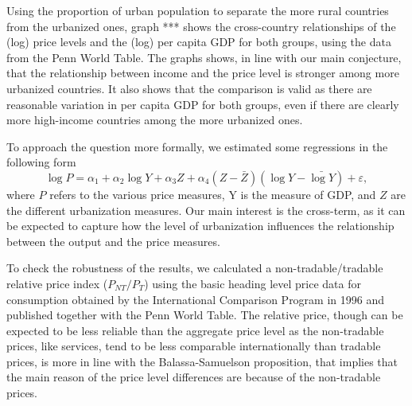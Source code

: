 \documentclass[12pt]{article}
\begin{document}
Using the proportion of urban population to separate the more rural
countries from the urbanized ones, graph *** shows the cross-country
relationships of the (log) price levels and the (log) per capita GDP
for both groups, using the data from the Penn World Table. The
graphs shows, in line with our main conjecture, that the
relationship between income and the price level is stronger among
more urbanized countries. It also shows that the comparison is valid
as there are reasonable variation in per capita GDP for both groups,
even if there are clearly more high-income countries among the more
urbanized ones.

To approach the question more formally, we estimated some
regressions in the following form
\begin{equation}
\log{P}=\alpha_1+\alpha_2\log Y+\alpha_3Z+\alpha_4(Z-\bar{Z})(\log Y-\bar{\log Y})+\varepsilon,
\end{equation}
where $P$ refers to the various price measures, Y is the measure of
GDP, and $Z$ are the different urbanization measures. Our main
interest is the cross-term, as it can be expected to capture how the
level of urbanization influences the relationship between the output
and the price measures.

To check the robustness of the results, we calculated a
non-tradable/tradable relative price index ($P_{NT}/P_{T}$) using
the basic heading level price data for consumption obtained by the
International Comparison Program in 1996 and published together with
the Penn World Table. The relative price, though can be expected to
be less reliable than the aggregate price level as the non-tradable
prices, like services, tend to be less comparable internationally
than tradable prices, is more in line with the Balassa-Samuelson
proposition, that implies that the main reason of the price level
differences are because of the non-tradable prices.
\end{document}
